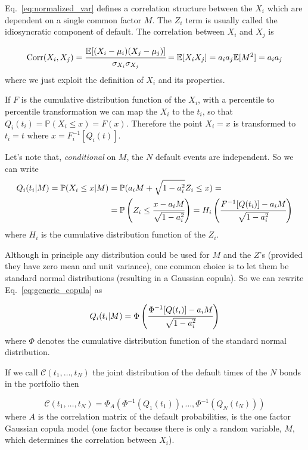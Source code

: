 Eq.~\ref{eq:normalized_var} defines a correlation structure between the
\(X_i\) which are dependent on a single common factor \(M\). The $Z_i$ term is usually 
called the idiosyncratic component of default. 
The correlation between \(X_i\) and \(X_j\) is

\[
\mathrm{Corr}(X_i, X_j) = \cfrac{\mathbb{E}[(X_i-\mu_i)(X_j-\mu_j)]}{\sigma_{X_i}\sigma_{X_j}} =\mathbb{E}[X_i X_j] = a_i a_j \mathbb{E}[M^2] = a_i a_j
\]
where we just exploit the definition of $X_i$ and its properties.

If $F$ is the cumulative distribution function of the $X_i$,
with a percentile to percentile transformation we can map the \(X_i\) to the \(t_i\), so that $Q_i(t_i) = \mathbb{P}(X_i\le x)=F(x)$.
Therefore the point \(X_i = x\) is transformed to \(t_i = t\) where
\(x = F_i^{-1}[Q_i(t)]\).

Let's note that, \emph{conditional} on $M$, the $N$ default events are independent. So we can write
\begin{equation}
\begin{split}
Q_i(t_i|M) = \mathbb{P}(X_i\le x|M) &= \mathbb{P}(a_i M + \sqrt{1-a_i^2}Z_i\le x) =\\
&= \mathbb{P}\left(Z_i\le \cfrac{x-a_i M}{\sqrt{1-a_i^2}}\right)
=H_i\left(\cfrac{F^{-1}[Q(t_i)]-a_i M}{\sqrt{1-a_i^2}}\right)
\end{split}
\label{eq:generic_copula}
\end{equation}
where $H_i$ is the cumulative distribution function of the $Z_i$.

Although in principle any distribution could be used for \(M\) and the
\(Z\)'s (provided they have zero mean and unit variance), one common
choice is to let them be standard normal distributions (resulting in a
Gaussian copula).
So we can rewrite Eq.~\ref{eq:generic_copula} as

\begin{equation}
Q_i(t_i|M) = \Phi\left(\cfrac{\Phi^{-1}[Q(t_i)]-a_i M}{\sqrt{1-a_i^2}}\right)
\label{eq:gaussian_one_factor_copula}
\end{equation}
where $\Phi$ denotes the cumulative distribution function of the standard normal distribution.

If we call $\mathcal{C}(t_1,\ldots,t_N)$ the joint distribution of the default times of the $N$ bonds  in the portfolio then

\[
\mathcal{C}(t_1,\ldots,t_N)=\Phi_{A}(\Phi^{-1}(Q_1(t_1)),\ldots,\Phi^{-1}(Q_N(t_N)))
\]
where $A$ is the correlation matrix of the default probabilities, is the one factor Gaussian copula model (one factor because there is only a random variable, $M$, which determines the correlation between $X_i$).

